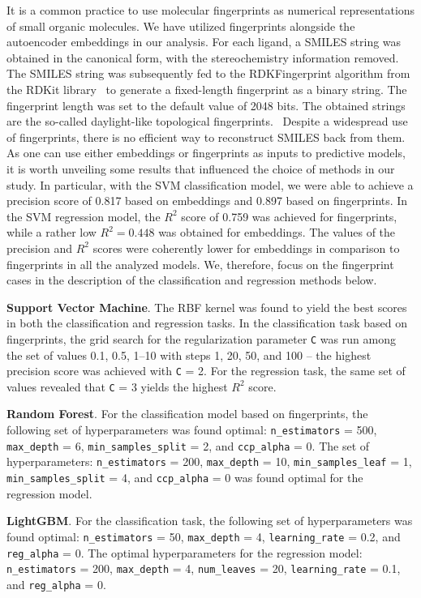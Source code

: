 \documentclass[12pt]{article}
\begin{document}
It is a common practice to use molecular fingerprints as numerical representations of small organic molecules.
We have utilized fingerprints alongside the autoencoder embeddings in our analysis.
For each ligand, a SMILES string was obtained in the canonical form, with the stereochemistry information removed. 
The SMILES string was subsequently fed to the RDKFingerprint algorithm from the RDKit library~\cite{RDKit:www} to generate a fixed-length fingerprint as a binary string.
The fingerprint length was set to the default value of 2048 bits.
The obtained strings are the so-called daylight-like topological fingerprints.~\cite{Green2021}
Despite a widespread use of fingerprints, there is no efficient way to reconstruct SMILES back from them.
As one can use either embeddings or fingerprints as inputs to predictive models, it is worth unveiling some results that influenced the choice of methods in our study.
In particular, with the SVM classification model, we were able to achieve a precision score of 0.817 based on embeddings and 0.897 based on fingerprints.
In the SVM regression model, the $R^2$ score of 0.759 was achieved for fingerprints, while a rather low $R^2 = 0.448$ was obtained for embeddings.
The values of the precision and $R^2$ scores were coherently lower for embeddings in comparison to fingerprints in all the analyzed models. 
We, therefore, focus on the fingerprint cases in the description of the classification and regression methods below.

\textbf{Support Vector Machine}.
The RBF kernel was found to yield the best scores in both the classification and regression tasks.
In the classification task based on fingerprints, the grid search for the regularization parameter \texttt{C} was run among the set of values 0.1, 0.5, 1--10 with steps 1, 20, 50, and 100 -- the highest precision score was achieved with \texttt{C} = 2.
For the regression task, the same set of values revealed that \texttt{C} = 3 yields the highest $R^2$ score.

\textbf{Random Forest}.
For the classification model based on fingerprints, the following set of hyperparameters was found optimal:
\texttt{n\_estimators} = 500,
\texttt{max\_depth} = 6,
\texttt{min\_samples\_split} = 2,
and \texttt{ccp\_alpha} = 0.
The set of hyperparameters:
\texttt{n\_estimators} = 200,
\texttt{max\_depth} = 10,
\texttt{min\_samples\_leaf} = 1,
\texttt{min\_samples\_split} = 4,
and \texttt{ccp\_alpha} = 0
was found optimal for the regression model.

\textbf{LightGBM}.
For the classification task, the following set of hyperparameters was found optimal:
\texttt{n\_estimators} = 50,
\texttt{max\_depth} = 4,
\texttt{learning\_rate} = 0.2,
and \texttt{reg\_alpha} = 0.
The optimal hyperparameters for the regression model:
\texttt{n\_estimators} = 200,
\texttt{max\_depth} = 4,
\texttt{num\_leaves} = 20,
\texttt{learning\_rate} = 0.1,
and \texttt{reg\_alpha} = 0.
\end{document}
